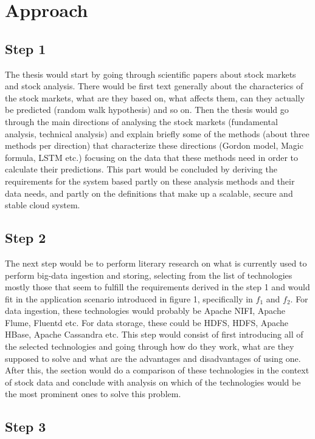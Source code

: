 \documentclass[article,11pt]{article}
\begin{document}
\section{Approach}

\subsection*{Step 1}

The thesis would start by going through scientific papers about stock markets and stock analysis.
There would be first text generally about the characterics of the stock markets, what are they based on, what affects them, can they actually be predicted (random walk hypothesis) and so on.
Then the thesis would go through the main directions of analysing the stock markets (fundamental analysis, technical analysis) and explain briefly some of the methods (about three methods per direction) that characterize these directions (Gordon model, Magic formula, LSTM etc.) focusing on the data that these methods need in order to calculate their predictions.
This part would be concluded by deriving the requirements for the system based partly on these analysis methods and their data needs, and partly on the definitions that make up a scalable, secure and stable cloud system.

\subsection*{Step 2}

The next step would be to perform literary research on what is currently used to perform big-data ingestion and storing, selecting from the list of technologies mostly those that seem to fulfill the requirements derived in the step 1 and would fit in the application scenario introduced in figure 1, specifically in $f_1$ and $f_2$.
For data ingestion, these technologies would probably be Apache NIFI, Apache Flume, Fluentd etc. 
For data storage, these could be HDFS, HDFS, Apache HBase, Apache Cassandra etc.
This step would consist of first introducing all of the selected technologies and going through how do they work, what are they supposed to solve and what are the advantages and disadvantages of using one.
After this, the section would do a comparison of these technologies in the context of stock data and conclude with analysis on which of the technologies would be the most prominent ones to solve this problem.

\subsection*{Step 3}
\end{document}
